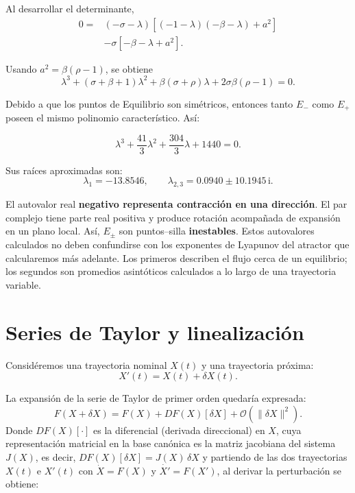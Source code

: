 \documentclass[12pt,a4paper,oneside]{report}
\theoremstyle{definition}
\numberwithin{equation}{chapter}
\begin{document}
Al desarrollar el determinante,
\begin{align}
    0={}&(-\sigma-\lambda) \left[(-1-\lambda)(-\beta-\lambda)+a^2\right]\nonumber\\
    &-\sigma\left[-\beta-\lambda+a^2\right].
\end{align}

Usando \(a^2=\beta(\rho-1)\), se obtiene
\begin{equation}
    \boxed{ \lambda^3+(\sigma+\beta+1)\lambda^2 +\beta(\sigma+\rho)\lambda +2\sigma\beta(\rho-1)=0.}
    \label{eq:polinomio-Epm}
\end{equation}

Debido a que los puntos de Equilibrio son simétricos, entonces tanto \(E_-\) como \(E_+\) poseen el mismo polinomio característico. Así:

\begin{equation}
    \lambda^3+\frac{41}{3}\lambda^2 +\frac{304}{3}\lambda+1440=0.
\end{equation}

Sus raíces aproximadas son:
\begin{equation}
    \boxed{ \lambda_1=-13.8546,\qquad \lambda_{2,3}=0.0940\pm10.1945\,\mathrm{i}.}
\end{equation}

El autovalor real \textbf{negativo representa contracción en una dirección}. El par complejo tiene parte real positiva y produce rotación acompañada de expansión en un plano local. Así, \(E_\pm\) son puntos--silla \textbf{inestables}. Estos autovalores calculados no deben confundirse con los exponentes de Lyapunov del atractor que calcularemos más adelante. Los primeros describen el flujo cerca de un equilibrio; los segundos son promedios asintóticos calculados a lo largo de una trayectoria variable.

\chapter{Series de Taylor y linealización}

Considéremos una trayectoria nominal \(X(t)\) y una trayectoria próxima:
\[
    X'(t)=X(t)+\delta X(t).
\]

La expansión de la serie de Taylor de primer orden quedaría expresada:
\begin{equation}
    F(X+\delta X) = F(X)+DF(X)[\delta X]+\mathcal{O}(\|\delta X\|^2).
\end{equation}
Donde \(DF(X)[\cdot]\) es la diferencial (derivada direccional) en \(X\), cuya representación matricial en la base canónica es la matriz jacobiana del sistema \(J(X)\), es decir, \(DF(X)[\delta X]=J(X)\,\delta X\) y partiendo de las dos trayectorias \(X(t)\) e \(X'(t)\) con \(\dot{X}=F(X)\) y \(\dot{X'}=F(X')\), al derivar la perturbación se obtiene:
\end{document}
